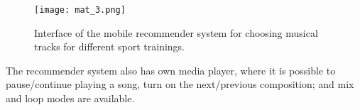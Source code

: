 \documentclass[10pt, a4paper]{article}
\begin{document}
\begin{multicols}{2}
\vspace{-0.5em}
\begin{figure}[H]
\centering
\texttt{[image: mat\_3.png]}
\vspace{-2em}
\caption{\footnotesize Interface of the mobile recommender system for choosing musical
tracks for different sport trainings.}
\label{fig3}
\end{figure}
\vspace{-0.7em}

\normalsize The recommender system also has own media player,
where it is possible to pause/continue playing a song, turn
on the next/previous composition; and mix and loop modes
are available.

\end{multicols}
\end{document}
